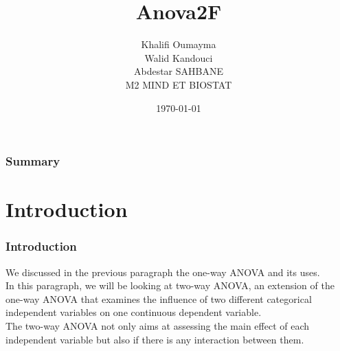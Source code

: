 \documentclass{beamer}
\title{ Anova2F}
\author{\color{rouge} Khalifi Oumayma\\Walid Kandouci\\ Abdestar SAHBANE\\\color{fandango} M2 MIND ET BIOSTAT}
\institute{Faculté des sciences Montpellier}
\date{\today}
\begin{document}
\begin{frame}
\titlepage
\end{frame}

\begin{frame}
\frametitle{Summary}
\tableofcontents
\end{frame}
\section{Introduction}
\begin{frame}
\frametitle{Introduction}
We discussed in the previous paragraph the one-way ANOVA and its uses.
\\
In this paragraph, we will be looking at two-way ANOVA, an extension of the one-way ANOVA that examines the influence of two different categorical independent variables on one continuous dependent variable. \\
The two-way ANOVA not only aims at assessing the main effect of each independent variable but also if there is any interaction between them.
\end{frame}
\end{document}
